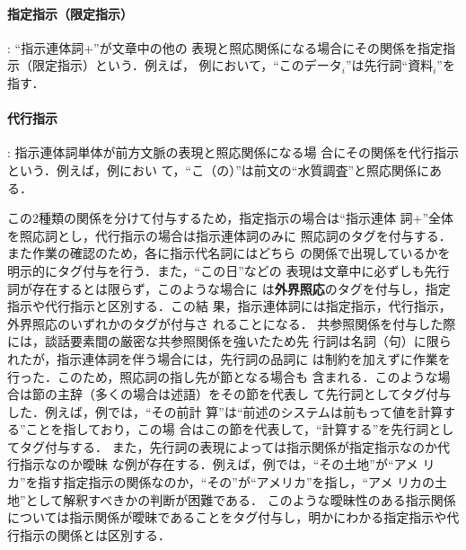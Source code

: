 \documentclass[japanese]{jnlp_1.4}
\def\brace#1{}
\begin{document}
\paragraph{指定指示（限定指示）}: ``指示連体詞+\brace{名詞（句）}''が文章中の他の
表現と照応関係になる場合にその関係を指定指示（限定指示）という．例えば，
例において，``このデータ$_i$''は先行詞``資料$_i$''を指す．

\paragraph{代行指示}: 指示連体詞単体が前方文脈の表現と照応関係になる場
合にその関係を{代行指示}という．例えば，例におい
て，``こ（の）''は前文の``水質調査''と照応関係にある．

この2種類の関係を分けて付与するため，指定指示の場合は``指示連体
詞+\brace{名詞（句）}''全体を照応詞とし，代行指示の場合は指示連体詞のみに
照応詞のタグを付与する．また作業の確認のため，各に指示代名詞にはどちら
の関係で出現しているかを明示的にタグ付与を行う．また，``この日''などの
表現は文章中に必ずしも先行詞が存在するとは限らず，このような場合に
は\textbf{外界照応}のタグを付与し，指定指示や代行指示と区別する．この結
果，指示連体詞には指定指示，代行指示，外界照応のいずれかのタグが付与さ
れることになる．
共参照関係を付与した際には，談話要素間の厳密な共参照関係を強いたため先
行詞は名詞（句）に限られたが，指示連体詞を伴う場合には，先行詞の品詞に
は制約を加えずに作業を行った．このため，照応詞の指し先が節となる場合も
含まれる．このような場合は節の主辞（多くの場合は述語）をその節を代表し
て先行詞としてタグ付与した．例えば，例では，``その前計
算''は``前述のシステムは前もって値を計算する''ことを指しており，この場
合はこの節を代表して，``計算する''を先行詞としてタグ付与する．
また，先行詞の表現によっては指示関係が指定指示なのか代行指示なのか曖昧
な例が存在する．例えば，例では，``その土地''が``アメ
リカ''を指す指定指示の関係なのか，``その''が``アメリカ''を指し，``アメ
リカの土地''として解釈すべきかの判断が困難である．
このような曖昧性のある指示関係については指示関係が曖昧であることをタグ付与し，明かにわかる指定指示や代行指示の関係とは区別する．
\end{document}
